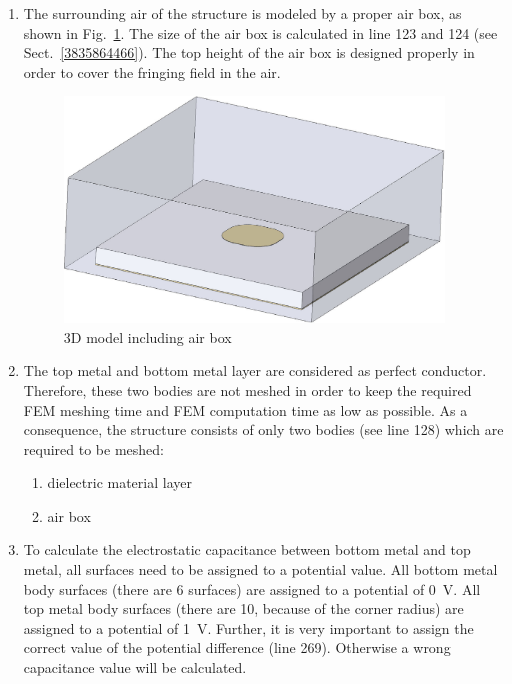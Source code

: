 \documentclass[10pt,a4paper,titlepage]{article}
\newcommand{\fig}[1]{Fig.~\ref{#1}}
\newcommand{\sect}[1]{Sect.~\ref{#1}}
\begin{document}
\begin{enumerate}
	\item The surrounding air of the structure is modeled by a proper air box, as shown in \fig{3835947430}. The size of the air box is calculated in line 123 and 124 (see \sect{3835864466}). The top height of the air box is designed properly in order to cover the fringing field in the air.
	
	\begin{figure}[H]
		\begin{center}
			\includegraphics[width=!, height=6cm, angle=0]{./fig/example_01.JPG}
			\caption{3D model including air box}
			\label{3835947430}
		\end{center}
	\end{figure}
	
	\item The top metal and bottom metal layer are considered as perfect conductor. Therefore, these two bodies are not meshed in order to keep the required FEM meshing time and FEM computation time as low as possible. As a consequence, the structure consists of only two bodies (see line 128) which are required to be meshed:
	\begin{enumerate}
		\item dielectric material layer
		\item air box
	\end{enumerate}

\item To calculate the electrostatic capacitance between bottom metal and top metal, all surfaces need to be assigned to a potential value. All bottom metal body surfaces (there are 6 surfaces) are assigned to a potential of \SI{0}{\volt}. All top metal body surfaces (there are 10, because of the corner radius) are assigned to a potential of \SI{1}{\volt}. Further, it is very important to assign the correct value of the potential difference (line 269). Otherwise a wrong capacitance value will be calculated.


\end{enumerate}
\end{document}
